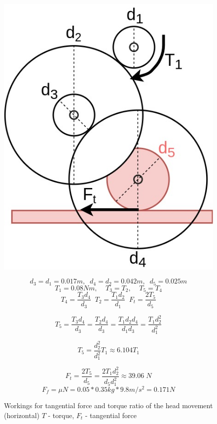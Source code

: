 \documentclass{article}
\begin{document}
\begin{figure}[h]

\centerline{\includegraphics[width=1\columnwidth]{figs-demo2/HEADGEARS.jpg}}

\[ d_3=d_1=0.017 m, \;\; d_4=d_2=0.042 m, \;\; d_5=0.025 m  \]
\[ T_1 = 0.08 Nm, \;\;\;\; T_3=T_2, \;\;\;\; T_5=T_4 \]
\[ T_4 = \frac{T_3d_4}{d_3} \;\; T_2 = \frac{T_1 d_2}{d_1} \;\; F_t = \frac{2T_5}{d_5} \]

\[ T_5 = \frac{T_3 d_4}{d_3} = \frac{T_2 d_4}{d_3} = \frac{T_1 d_2 d_4}{d_1 d_3} = \frac{T_1 d_2^2}{d_1^2} \]

\[ T_5 = \frac{d_2^2}{d_1^2}T_1 \approx 6.104 T_1 \]

\[ F_t = \frac{2T_5}{d_5} = \frac{2 T_1 d_2^2}{d_5 d_1^2} \approx 39.06 \; N \]
\[ F_f = \mu N = 0.05 * 0.35 kg * 9.8 m/s^2 = 0.171 N \]


\caption{Workings for tangential force and torque ratio of the head movement (horizontal) \(T\) - torque, \(F_t\) - tangential force}
\label{fig:head-formula}
\end{figure}
\end{document}
